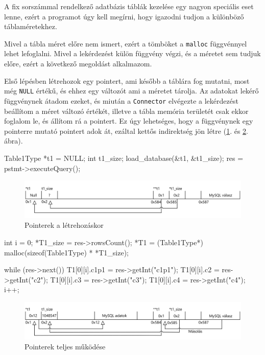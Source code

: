 
A fix sorszámmal rendelkező adatbázis táblák kezelése egy nagyon speciális eset lenne, ezért a programot úgy kell megírni, hogy igazodni tudjon a különböző táblaméretekhez.

Mivel a tábla méret előre nem ismert, ezért a tömböket a \texttt{malloc} függvénnyel lehet lefoglalni. Mivel a lekérdezést külön függvény végzi, és a méretet sem tudjuk előre, ezért a következő megoldást alkalmazom.

Első lépésben létrehozok egy pointert, ami később a táblára fog mutatni, most még \texttt{NULL} értékű, és ehhez egy változót ami a méretet tárolja. Az adatokat lekérő függvénynek átadom ezeket, és miután a \texttt{Connector} elvégezte a lekérdezést beállítom a méret változó értékét, illetve a tábla memória területét csak ekkor foglalom le, és állítom rá a pointert. Ez úgy lehetséges, hogy a függvénynek egy pointerre mutató pointert adok át, ezáltal kettős indirektség jön létre (\ref{fig:pointer_01}. és \ref{fig:pointer_02}. ábra).

\begin{cpp}
Table1Type *t1 = NULL;
int t1_size;
load_database(&t1, &t1_size);
res = pstmt->executeQuery();
\end{cpp}
\begin{figure}[h!]
\centering
\includegraphics[width=\textwidth]{images/implementation/pointer_01.png}
\caption{Pointerek a létrehozáskor}
\label{fig:pointer_01}
\end{figure}
\begin{cpp}
int i = 0;
*T1_size = res->rowsCount();
*T1 = (Table1Type*) malloc(sizeof(Table1Type) * *T1_size);

while (res->next()) {
    T1[0][i].c1p1 = res->getInt("c1p1");
    T1[0][i].c2 = res->getInt("c2");
    T1[0][i].c3 = res->getInt("c3");
    T1[0][i].c4 = res->getInt("c4");
    i++;
}
\end{cpp}

\begin{figure}[h!]
\centering
\includegraphics[width=\textwidth]{images/implementation/pointer_02.png}
\caption{Pointerek teljes működése}
\label{fig:pointer_02}
\end{figure}

